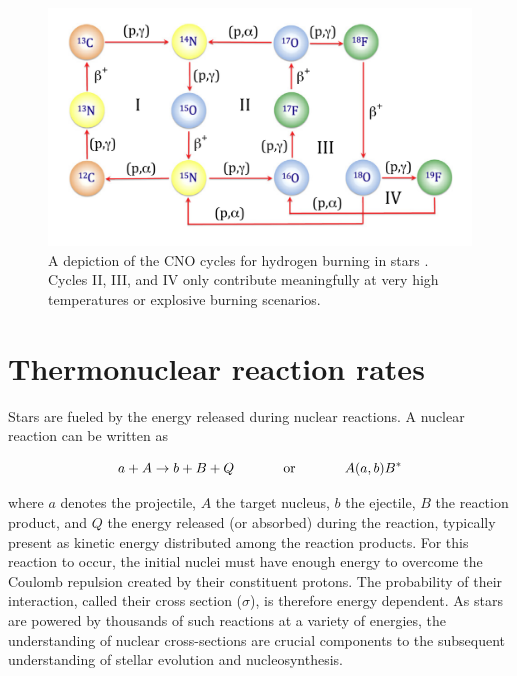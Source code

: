 \begin{figure}
\includegraphics[width=\linewidth]{figures/cnoCycles.png}
\caption{A depiction of the CNO cycles for hydrogen burning in stars \cite{Bertulani2016}. Cycles II, III, and IV only contribute meaningfully at very high temperatures or explosive burning scenarios. }
\label{fig: CNO-cycles}
\end{figure}




\section{Thermonuclear reaction rates}
\label{sec: thermonuclear reaction rates}

Stars are fueled by the energy released during nuclear reactions. A nuclear reaction can be written as 

\begin{equation}
a + A \rightarrow b + B + Q \hspace{0.5in} \text{or} \hspace{0.5in} A(a,b)B^{*}
\end{equation}

\noindent where $a$ denotes the projectile, $A$ the target nucleus, $b$ the ejectile, $B$ the reaction product, and $Q$ the energy released (or absorbed) during the reaction, typically present as kinetic energy distributed among the reaction products. For this reaction to occur, the initial nuclei must have enough energy to overcome the Coulomb repulsion created by their constituent protons. The probability of their interaction, called their cross section ($\sigma$), is therefore energy dependent. As stars are powered by thousands of such reactions at a variety of energies, the understanding of nuclear cross-sections are crucial components to the subsequent understanding of stellar evolution and nucleosynthesis. 

